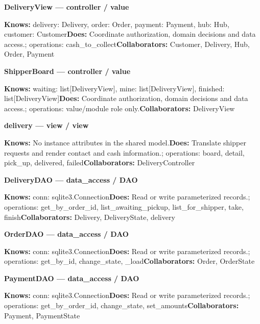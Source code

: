 \textbf{DeliveryView --- controller / \guillemotleft{}value\guillemotright{}}

\textbf{Knows:} delivery: Delivery, order: Order, payment: Payment, hub: Hub, customer: Customer\newline{}\textbf{Does:} Coordinate authorization, domain decisions and data access.; operations: cash\_to\_collect\newline{}\textbf{Collaborators:} Customer, Delivery, Hub, Order, Payment

\textbf{ShipperBoard --- controller / \guillemotleft{}value\guillemotright{}}

\textbf{Knows:} waiting: list[DeliveryView], mine: list[DeliveryView], finished: list[DeliveryView]\newline{}\textbf{Does:} Coordinate authorization, domain decisions and data access.; operations: value/module role only.\newline{}\textbf{Collaborators:} DeliveryView

\textbf{delivery --- view / \guillemotleft{}view\guillemotright{}}

\textbf{Knows:} No instance attributes in the shared model.\newline{}\textbf{Does:} Translate shipper requests and render contact and cash information.; operations: board, detail, pick\_up, delivered, failed\newline{}\textbf{Collaborators:} DeliveryController

\textbf{DeliveryDAO --- data\_access / \guillemotleft{}DAO\guillemotright{}}

\textbf{Knows:} conn: sqlite3.Connection\newline{}\textbf{Does:} Read or write parameterized records.; operations: get\_by\_order\_id, list\_awaiting\_pickup, list\_for\_shipper, take, finish\newline{}\textbf{Collaborators:} Delivery, DeliveryState, delivery

\textbf{OrderDAO --- data\_access / \guillemotleft{}DAO\guillemotright{}}

\textbf{Knows:} conn: sqlite3.Connection\newline{}\textbf{Does:} Read or write parameterized records.; operations: get\_by\_id, change\_state, \_load\newline{}\textbf{Collaborators:} Order, OrderState

\textbf{PaymentDAO --- data\_access / \guillemotleft{}DAO\guillemotright{}}

\textbf{Knows:} conn: sqlite3.Connection\newline{}\textbf{Does:} Read or write parameterized records.; operations: get\_by\_order\_id, change\_state, set\_amounts\newline{}\textbf{Collaborators:} Payment, PaymentState

